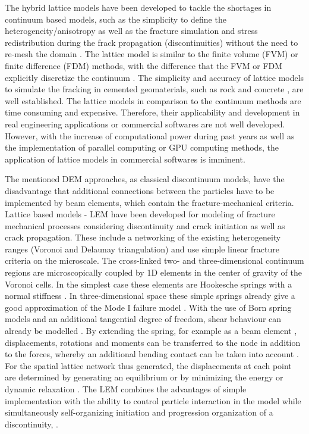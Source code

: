 The hybrid lattice models have been developed to tackle the shortages in continuum based models, such as the simplicity to define the heterogeneity/anisotropy as well as the fracture simulation and stress redistribution during the frack propagation (discontinuities) without the need to re-mesh the domain \cite{Bolanderetal1998, vanMieretal2002}. The lattice model is similar to the finite volume (FVM) or finite difference (FDM) methods, with the difference that the FVM or FDM explicitly discretize the continuum \cite{Rizvietal2018a, Rizvietal2018c}. The simplicity and accuracy of lattice models to simulate the fracking in cemented geomaterials, such as rock and concrete \cite{Liuetal2007, Pradoetal2003, Karihalooetal2003}, are well established. The lattice models in comparison to the continuum methods are time consuming and expensive. Therefore, their applicability and development in real engineering applications or commercial softwares are not well developed. However, with the increase of computational power during past years as well as the implementation of parallel computing or GPU computing methods, the application of lattice models in commercial softwares is imminent.

The mentioned DEM approaches, as classical discontinuum models, have the disadvantage that additional connections between the particles have to be implemented by beam elements, which contain the fracture-mechanical criteria. Lattice based models - LEM \cite{Chessa200310, Chung199615094} have been developed for modeling of fracture mechanical processes considering discontinuity and crack initiation as well as crack propagation. These include a networking of the existing heterogeneity ranges (Voronoi and Delaunay triangulation) and use simple linear fracture criteria on the microscale. The cross-linked two- and three-dimensional continuum regions are microscopically coupled by 1D elements in the center of gravity of the Voronoi cells. In the simplest case these elements are Hookesche springs with a normal stiffness \cite{Curtin1990535}. In three-dimensional space these simple springs already give a good approximation of the Mode I failure model \cite{Wong2015417}. With the use of Born spring models and an additional tangential degree of freedom, shear behaviour can already be modelled \cite{Jagota19933123}. By extending the spring, for example as a beam element \cite{Schlangen1992435}, displacements, rotations and moments can be transferred to the node in addition to the forces, whereby an additional bending contact can be taken into account \cite{Sahimi1993713}. For the spatial lattice network thus generated, the displacements at each point are determined by generating an equilibrium or by minimizing the energy \cite{Meakin1991226} or dynamic relaxation \cite{Cundall197947}. The LEM combines the advantages of simple implementation with the ability to control particle interaction in the model while simultaneously self-organizing initiation and progression organization of a discontinuity, \cite{Sattarietal2019b, Wuttke201785}.

